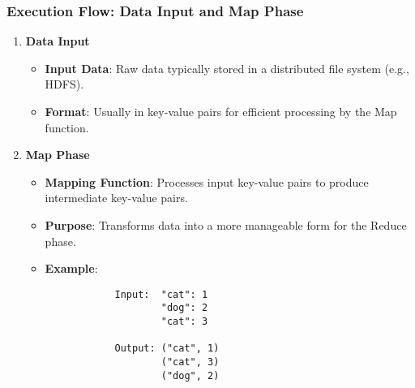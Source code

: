 \documentclass[aspectratio=169]{beamer}
\begin{document}
\begin{frame}[fragile]
    \frametitle{Execution Flow: Data Input and Map Phase}
    \begin{enumerate}
        \item \textbf{Data Input}
        \begin{itemize}
            \item \textbf{Input Data}: Raw data typically stored in a distributed file system (e.g., HDFS).
            \item \textbf{Format}: Usually in key-value pairs for efficient processing by the Map function.
        \end{itemize}
        
        \item \textbf{Map Phase}
        \begin{itemize}
            \item \textbf{Mapping Function}: Processes input key-value pairs to produce intermediate key-value pairs.
            \item \textbf{Purpose}: Transforms data into a more manageable form for the Reduce phase.
            \item \textbf{Example}: 
            \begin{lstlisting}
            Input:  "cat": 1  
                    "dog": 2  
                    "cat": 3  

            Output: ("cat", 1)  
                    ("cat", 3)  
                    ("dog", 2)  
            \end{lstlisting}
        \end{itemize}
    \end{enumerate}
\end{frame}
\end{document}
